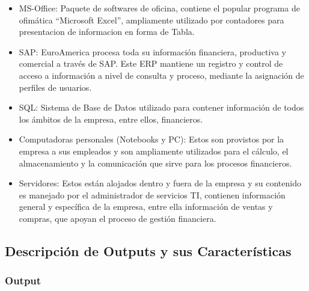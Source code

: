 {	
	\vspace{3mm}
	
	
	\begin{itemize}
	\item MS-Office: Paquete de softwares de oficina, contiene el popular programa de ofimática “Microsoft Excel”, ampliamente utilizado por contadores para presentacion de informacion en forma de Tabla.
	\item SAP: EuroAmerica procesa toda su información financiera, productiva y comercial a través de SAP. Este ERP mantiene un registro y control de acceso a información a nivel de consulta y proceso, mediante la asignación de perfiles de usuarios.
	\item SQL: Sistema de Base de Datos utilizado para contener información de todos los ámbitos de la empresa, entre ellos, financieros.
	\end{itemize}
	
	\vspace{3mm}
	
	
	\begin{itemize}
	\item Computadoras personales (Notebooks y PC): Estos son provistos por la empresa a sus empleados y son ampliamente utilizados para el cálculo, el almacenamiento y la comunicación que sirve para los procesos financieros.
	\item Servidores: Estos están alojados dentro y fuera de la empresa y su contenido es manejado por el administrador de servicios TI, contienen información general y específica de la empresa, entre ella información de ventas y compras, que apoyan el proceso de gestión financiera.
	\end{itemize}
	
	\subsection{Descripción de Outputs y sus Características}
	
	\subsubsection{Output}
	
}

